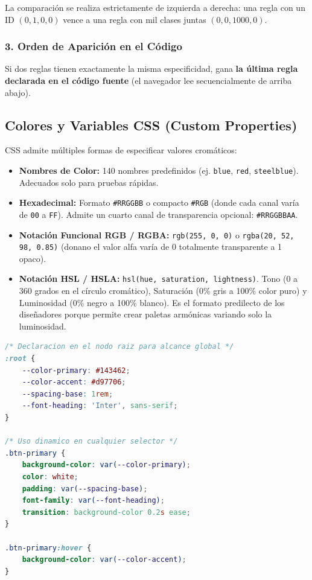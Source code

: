 La comparación se realiza estrictamente de izquierda a derecha: una regla con un ID $(0, 1, 0, 0)$ vence a una regla con mil clases juntas $(0, 0, 1000, 0)$.

\subsubsection{3. Orden de Aparición en el Código}
Si dos reglas tienen exactamente la misma especificidad, gana \textbf{la última regla declarada en el código fuente} (el navegador lee secuencialmente de arriba abajo).

\subsection{Colores y Variables CSS (Custom Properties)}

CSS admite múltiples formas de especificar valores cromáticos:
\begin{itemize}[leftmargin=1.2cm]
  \item \textbf{Nombres de Color:} 140 nombres predefinidos (ej. \texttt{blue}, \texttt{red}, \texttt{steelblue}). Adecuados solo para pruebas rápidas.
  \item \textbf{Hexadecimal:} Formato \texttt{\#RRGGBB} o compacto \texttt{\#RGB} (donde cada canal varía de \texttt{00} a \texttt{FF}). Admite un cuarto canal de transparencia opcional: \texttt{\#RRGGBBAA}.
  \item \textbf{Notación Funcional RGB / RGBA:} \texttt{rgb(255, 0, 0)} o \texttt{rgba(20, 52, 98, 0.85)} (donano el valor alfa varía de 0 totalmente transparente a 1 opaco).
  \item \textbf{Notación HSL / HSLA:} \texttt{hsl(hue, saturation, lightness)}. Tono (0 a 360 grados en el círculo cromático), Saturación (0\% gris a 100\% color puro) y Luminosidad (0\% negro a 100\% blanco). Es el formato predilecto de los diseñadores porque permite crear paletas armónicas variando solo la luminosidad.
\end{itemize}

\begin{lstlisting}[language=css, caption={Declaración y uso de variables nativas en CSS3.}]
/* Declaracion en el nodo raiz para alcance global */
:root {
    --color-primary: #143462;
    --color-accent: #d97706;
    --spacing-base: 1rem;
    --font-heading: 'Inter', sans-serif;
}

/* Uso dinamico en cualquier selector */
.btn-primary {
    background-color: var(--color-primary);
    color: white;
    padding: var(--spacing-base);
    font-family: var(--font-heading);
    transition: background-color 0.2s ease;
}

.btn-primary:hover {
    background-color: var(--color-accent);
}
\end{lstlisting}

